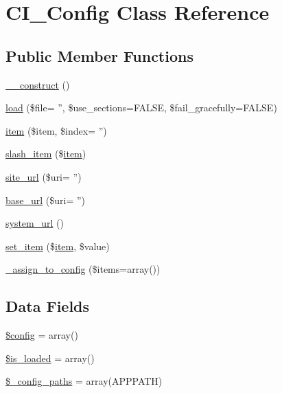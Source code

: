 \hypertarget{class_c_i___config}{\section{C\-I\-\_\-\-Config Class Reference}
\label{class_c_i___config}
}
\subsection*{Public Member Functions}
\begin{DoxyCompactItemize}
\item 
\hyperlink{class_c_i___config_a095c5d389db211932136b53f25f39685}{\-\_\-\-\_\-construct} ()
\item 
\hyperlink{class_c_i___config_a0a60e9c6f42437ae6516365cde24f43d}{load} (\$file= '', \$use\-\_\-sections=F\-A\-L\-S\-E, \$fail\-\_\-gracefully=F\-A\-L\-S\-E)
\item 
\hyperlink{class_c_i___config_accce7538d9763368e5955daf97d28f42}{item} (\$item, \$index= '')
\item 
\hyperlink{class_c_i___config_abead21ebddc51d12402b5320d531eb1f}{slash\-\_\-item} (\$\hyperlink{class_c_i___config_accce7538d9763368e5955daf97d28f42}{item})
\item 
\hyperlink{class_c_i___config_a13bf10ba2927ce9b0bd17a1bd27c1f1a}{site\-\_\-url} (\$uri= '')
\item 
\hyperlink{class_c_i___config_a1ece6d97b2f22c30cac390f926db1e43}{base\-\_\-url} (\$uri= '')
\item 
\hyperlink{class_c_i___config_a71e857f8dd38c230f1ce11bacf177ba8}{system\-\_\-url} ()
\item 
\hyperlink{class_c_i___config_a3cbd3bcacb546d42f5dd12213df48627}{set\-\_\-item} (\$\hyperlink{class_c_i___config_accce7538d9763368e5955daf97d28f42}{item}, \$value)
\item 
\hyperlink{class_c_i___config_a4eef305686918461a7ea846a8081be1e}{\-\_\-assign\-\_\-to\-\_\-config} (\$items=array())
\end{DoxyCompactItemize}
\subsection*{Data Fields}
\begin{DoxyCompactItemize}
\item 
\hyperlink{class_c_i___config_a49c7011be9c979d9174c52a8b83e5d8e}{\$config} = array()
\item 
\hyperlink{class_c_i___config_a908e9ad52a5d1956d360689452f6bdbe}{\$is\-\_\-loaded} = array()
\item 
\hyperlink{class_c_i___config_a5f47dbd2111b5bb6c91ece69fefebf26}{\$\-\_\-config\-\_\-paths} = array(A\-P\-P\-P\-A\-T\-H)
\end{DoxyCompactItemize}

